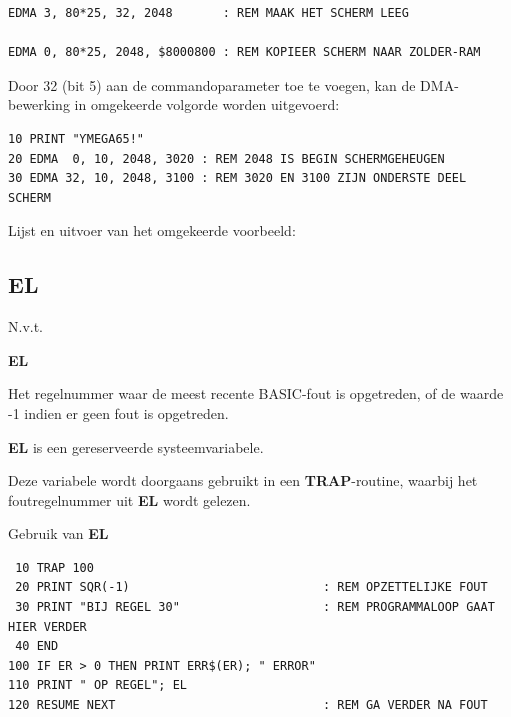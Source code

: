 \begin{description}[leftmargin=2cm,style=nextline]
\begin{tcolorbox}[colback=black,coltext=white]
\begin{verbatim}
EDMA 3, 80*25, 32, 2048       : REM MAAK HET SCHERM LEEG

EDMA 0, 80*25, 2048, $8000800 : REM KOPIEER SCHERM NAAR ZOLDER-RAM
\end{verbatim}
\end{tcolorbox}

                  Door 32 (bit 5) aan de commandoparameter toe te voegen, kan de DMA-bewerking in omgekeerde volgorde worden uitgevoerd:

\begin{tcolorbox}[colback=black,coltext=white]
\verbatimfont{\codefont}
\begin{verbatim}
10 PRINT "ƳMEGA65!"
20 EDMA  0, 10, 2048, 3020 : REM 2048 IS BEGIN SCHERMGEHEUGEN
30 EDMA 32, 10, 2048, 3100 : REM 3020 EN 3100 ZIJN ONDERSTE DEEL SCHERM
\end{verbatim}
\end{tcolorbox}
\clearpage

                  Lijst en uitvoer van het omgekeerde voorbeeld:

\end{description}


\newpage
\subsection{EL}
\begin{description}[leftmargin=2cm,style=nextline]
\item [Token:]    N.v.t.

\item [Formaat:]   {\bf EL}

\item [Gebruik:]    Het regelnummer waar de meest recente BASIC-fout is opgetreden, of de waarde -1 indien er geen fout is opgetreden.

\item [Opmerkingen:]  {\bf EL} is een gereserveerde systeemvariabele.

                  Deze variabele wordt doorgaans gebruikt in een {\bf TRAP}-routine, waarbij het foutregelnummer uit {\bf EL} wordt gelezen.

\item [Voorbeeld:]  Gebruik van {\bf EL}

\begin{tcolorbox}[colback=black,coltext=white]
\verbatimfont{\codefont}
\begin{verbatim}
 10 TRAP 100
 20 PRINT SQR(-1)                           : REM OPZETTELIJKE FOUT
 30 PRINT "BIJ REGEL 30"                    : REM PROGRAMMALOOP GAAT HIER VERDER
 40 END
100 IF ER > 0 THEN PRINT ERR$(ER); " ERROR"
110 PRINT " OP REGEL"; EL
120 RESUME NEXT                             : REM GA VERDER NA FOUT
\end{verbatim}
\end{tcolorbox}
\end{description}

